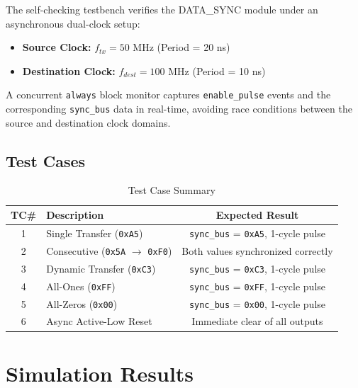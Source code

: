\documentclass[12pt,a4paper]{article}
\begin{document}
The self-checking testbench verifies the DATA\_SYNC module under an asynchronous dual-clock setup:
\begin{itemize}
    \item \textbf{Source Clock:} $f_{tx} = 50$ MHz (Period = 20 ns)
    \item \textbf{Destination Clock:} $f_{dest} = 100$ MHz (Period = 10 ns)
\end{itemize}

A concurrent \texttt{always} block monitor captures \texttt{enable\_pulse} events and the corresponding \texttt{sync\_bus} data in real-time, avoiding race conditions between the source and destination clock domains.

\subsection{Test Cases}
\begin{table}[H]
\centering
\begin{tabular}{@{}clc@{}}
\toprule
\textbf{TC\#} & \textbf{Description} & \textbf{Expected Result} \\
\midrule
1 & Single Transfer (\texttt{0xA5})       & \texttt{sync\_bus} = \texttt{0xA5}, 1-cycle pulse \\
2 & Consecutive (\texttt{0x5A} $\to$ \texttt{0xF0}) & Both values synchronized correctly \\
3 & Dynamic Transfer (\texttt{0xC3})      & \texttt{sync\_bus} = \texttt{0xC3}, 1-cycle pulse \\
4 & All-Ones (\texttt{0xFF})              & \texttt{sync\_bus} = \texttt{0xFF}, 1-cycle pulse \\
5 & All-Zeros (\texttt{0x00})             & \texttt{sync\_bus} = \texttt{0x00}, 1-cycle pulse \\
6 & Async Active-Low Reset               & Immediate clear of all outputs \\
\bottomrule
\end{tabular}
\caption{Test Case Summary}
\end{table}



\section{Simulation Results}
\end{document}
